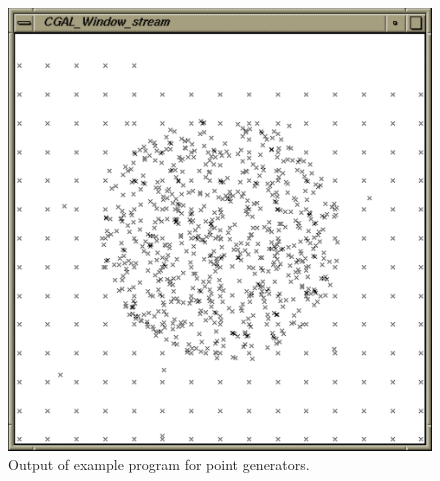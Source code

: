 
\begin{ccTexOnly}
  \begin{figure}
    \noindent
    \hspace*{0.025\textwidth}%
    \begin{minipage}{0.45\textwidth}%
      \includegraphics[width=\textwidth]{Generator/generators_prog1}
      \caption{Output of example program for point generators.}
      \label{figurePointGenerator}
    \end{minipage}%
    \hspace*{0.05\textwidth}%
    \begin{minipage}{0.45\textwidth}%

\end{minipage}
\end{figure}
\end{ccTexOnly}

